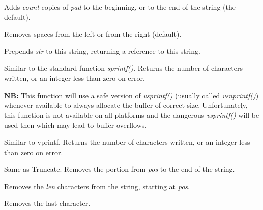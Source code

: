 
Adds {\it count} copies of {\it pad} to the beginning, or to the end of the string (the default).

Removes spaces from the left or from the right (default).

\label{wxstringprepend}


Prepends {\it str} to this string, returning a reference to this string.

\label{wxstringprintf}


Similar to the standard function {\it sprintf()}. Returns the number of
characters written, or an integer less than zero on error.

{\bf NB:} This function will use a safe version of {\it vsprintf()} (usually called 
{\it vsnprintf()}) whenever available to always allocate the buffer of correct
size. Unfortunately, this function is not available on all platforms and the
dangerous {\it vsprintf()} will be used then which may lead to buffer overflows.

\label{wxstringprintfv}


Similar to vprintf. Returns the number of characters written, or an integer less than zero
on error.

\label{wxstringremove}


Same as Truncate. Removes the portion from {\it pos} to the end of the string.


Removes the {\it len} characters from the string, starting at {\it pos}.

\label{wxstringremovelast}


Removes the last character.

\label{wxstringreplace}

